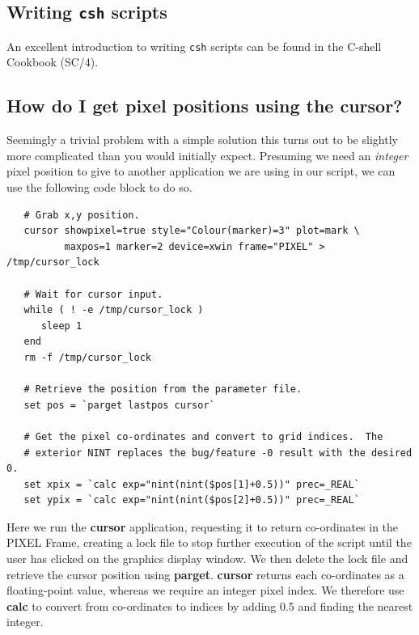 \documentclass[twoside,11pt]{article}
\newcommand{\xref}[3]{#1}
\newcommand{\xlabel}[1]{}
\begin{document}
\begin{\htmlonly}
{\newpage
\section{\xlabel{sc16_writingcsh}Writing {\tt csh} scripts\label{sc16_writingcsh}}

An excellent introduction to writing {\tt csh} scripts can be found in
the \xref{C-shell Cookbook}{sc4}{} (SC/4).

\subsection{How do I get pixel positions using the cursor?}

Seemingly a trivial problem with a simple solution this turns out to
be slightly more complicated than you would initially expect.
Presuming we need an {\em integer} pixel position to give to another
application we are using in our script, we can use the following code
block to do so.

\small\begin{verbatim}
   # Grab x,y position.
   cursor showpixel=true style="Colour(marker)=3" plot=mark \
          maxpos=1 marker=2 device=xwin frame="PIXEL" > /tmp/cursor_lock

   # Wait for cursor input.
   while ( ! -e /tmp/cursor_lock )
      sleep 1
   end
   rm -f /tmp/cursor_lock

   # Retrieve the position from the parameter file.
   set pos = `parget lastpos cursor`

   # Get the pixel co-ordinates and convert to grid indices.  The
   # exterior NINT replaces the bug/feature -0 result with the desired 0.
   set xpix = `calc exp="nint(nint($pos[1]+0.5))" prec=_REAL`
   set ypix = `calc exp="nint(nint($pos[2]+0.5))" prec=_REAL`
\end{verbatim}\normalsize

Here we run the \xref{{\bf cursor}}{sun95}{CURSOR} application, requesting
it to return co-ordinates in the \xref{PIXEL Frame}{sun95}{se_wcsuse},
creating a lock file to stop further execution of the script until the
user has clicked on the graphics display window.  We then delete the
lock file and retrieve the cursor position using
\xref{{\bf parget}}{sun95}{PARGET}.  {\bf cursor} returns each co-ordinates as
a floating-point value, whereas we require an integer pixel index.  We
therefore use \xref{{\bf calc}}{sun95}{CALC} to convert from co-ordinates to
indices by adding 0.5 and finding the nearest integer.

}
\end{\htmlonly}
\end{document}

